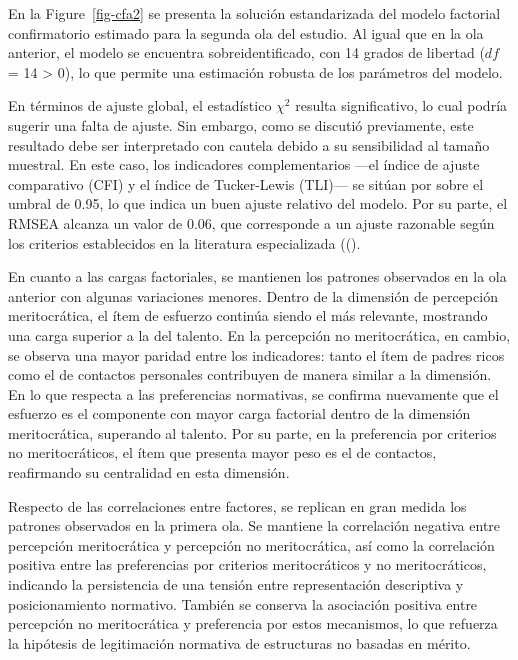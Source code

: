 \documentclass[
  12pt,
]{article}
\begin{document}
En la Figure~\ref{fig-cfa2} se presenta la solución estandarizada del
modelo factorial confirmatorio estimado para la segunda ola del estudio.
Al igual que en la ola anterior, el modelo se encuentra
sobreidentificado, con 14 grados de libertad (\(df\) = 14 \textgreater{}
0), lo que permite una estimación robusta de los parámetros del modelo.

En términos de ajuste global, el estadístico \(\chi^2\) resulta
significativo, lo cual podría sugerir una falta de ajuste. Sin embargo,
como se discutió previamente, este resultado debe ser interpretado con
cautela debido a su sensibilidad al tamaño muestral. En este caso, los
indicadores complementarios ---el índice de ajuste comparativo (CFI) y
el índice de Tucker-Lewis (TLI)--- se sitúan por sobre el umbral de
0.95, lo que indica un buen ajuste relativo del modelo. Por su parte, el
RMSEA alcanza un valor de 0.06, que corresponde a un ajuste razonable
según los criterios establecidos en la literatura especializada
(().

En cuanto a las cargas factoriales, se mantienen los patrones observados
en la ola anterior con algunas variaciones menores. Dentro de la
dimensión de percepción meritocrática, el ítem de esfuerzo continúa
siendo el más relevante, mostrando una carga superior a la del talento.
En la percepción no meritocrática, en cambio, se observa una mayor
paridad entre los indicadores: tanto el ítem de padres ricos como el de
contactos personales contribuyen de manera similar a la dimensión. En lo
que respecta a las preferencias normativas, se confirma nuevamente que
el esfuerzo es el componente con mayor carga factorial dentro de la
dimensión meritocrática, superando al talento. Por su parte, en la
preferencia por criterios no meritocráticos, el ítem que presenta mayor
peso es el de contactos, reafirmando su centralidad en esta dimensión.

Respecto de las correlaciones entre factores, se replican en gran medida
los patrones observados en la primera ola. Se mantiene la correlación
negativa entre percepción meritocrática y percepción no meritocrática,
así como la correlación positiva entre las preferencias por criterios
meritocráticos y no meritocráticos, indicando la persistencia de una
tensión entre representación descriptiva y posicionamiento normativo.
También se conserva la asociación positiva entre percepción no
meritocrática y preferencia por estos mecanismos, lo que refuerza la
hipótesis de legitimación normativa de estructuras no basadas en mérito.
\end{document}
